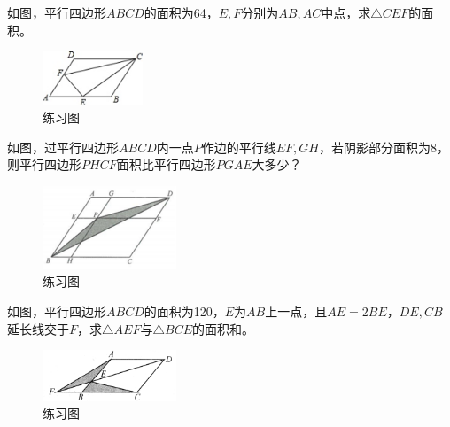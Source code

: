 \documentclass{ecnuthesis}
\begin{document}
\begin{problem}
    如图，平行四边形$𝐴𝐵𝐶𝐷$的面积为64，$E,F$分别为$AB,AC$中点，求$\triangle CEF$的面积。
\end{problem}
\begin{figure}[H]
\centering
\includegraphics[width=3cm]{picture/683.png}
\caption{练习图}
\end{figure}
\begin{problem}
    如图，过平行四边形$𝐴𝐵𝐶𝐷$内一点$P$作边的平行线$EF,GH$，若阴影部分面积为$8$，则平行四边形$PHCF$面积比平行四边形$PGAE$大多少？
\end{problem}
\begin{figure}[H]
\centering
\includegraphics[width=4cm]{picture/684.png}
\caption{练习图}
\end{figure}
\begin{problem}
    如图，平行四边形$ABCD$的面积为120，$E$为$AB$上一点，且$AE=2BE$，$DE,CB$延长线交于$F$，求$\triangle AEF$与$\triangle BCE$的面积和。
\end{problem}
\begin{figure}[H]
\centering
\includegraphics[width=4cm]{picture/687.png}
\caption{练习图}
\end{figure}
\clearpage
\end{document}
